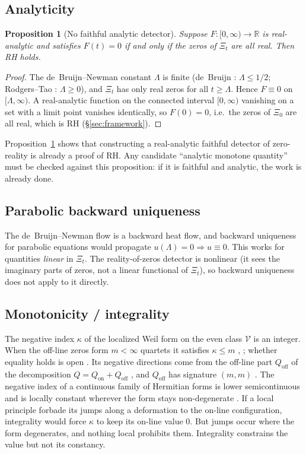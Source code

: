 \documentclass[11pt]{amsart}
\newtheorem{proposition}[theorem]{Proposition}
\theoremstyle{definition}
\theoremstyle{remark}
\newcommand{\bbR}{\mathbb{R}}
\begin{document}
\subsection{Analyticity}\label{ssec:analyticity}
\begin{proposition}[No faithful analytic detector]\label{prop:analytic}
Suppose $F:[0,\infty)\to\bbR$ is real-analytic and satisfies $F(t)=0$ if
and only if the zeros of $\Xi_t$ are all real. Then RH holds.
\end{proposition}
\begin{proof}
The de~Bruijn--Newman constant $\Lambda$ is finite (de~Bruijn \cite{dB}: $\Lambda\le1/2$;
Rodgers--Tao \cite{RT}: $\Lambda\ge0$), and $\Xi_t$ has only real zeros for all $t\geq\Lambda$.
Hence $F\equiv0$ on $[\Lambda,\infty)$. A real-analytic function on the connected interval
$[0,\infty)$ vanishing on a set with a limit point vanishes identically, so $F(0)=0$, i.e.\ the
zeros of $\Xi_0$ are all real, which is RH (\S\ref{sec:framework}).
\end{proof}

Proposition~\ref{prop:analytic} shows that constructing a real-analytic faithful detector of
zero-reality is already a proof of RH. Any candidate ``analytic monotone quantity'' must be
checked against this proposition: if it is faithful and analytic, the work is already done.

\subsection{Parabolic backward uniqueness}\label{ssec:backward}
The de~Bruijn--Newman flow is a backward heat flow, and backward uniqueness for parabolic
equations would propagate $u(\Lambda)=0\Rightarrow u\equiv0$. This works for quantities
\emph{linear} in $\Xi_t$. The reality-of-zeros detector is nonlinear (it sees the imaginary parts
of zeros, not a linear functional of $\Xi_t$), so backward uniqueness does not apply to it
directly.

\subsection{Monotonicity / integrality}\label{ssec:integrality}
The negative index $\kappa$ of the localized Weil form on the even class $\mathcal V$ is an
integer. When the off-line zeros form $m<\infty$ quartets it satisfies $\kappa\le m$
\cite[Prop.~2.5]{P25}, \cite[Cor.~6.5]{P18}; whether equality holds is open \cite{P25}. Its
negative directions come from the off-line part $Q_{\mathrm{off}}$ of the decomposition
$Q=Q_{\mathrm{on}}+Q_{\mathrm{off}}$ \cite[Thm.~3.1]{P18}, and $Q_{\mathrm{off}}$ has signature
$(m,m)$ \cite[Cor.~6.5]{P18}. The negative index of a continuous family of Hermitian forms is
lower semicontinuous and is locally constant wherever the form stays non-degenerate
\cite[Thm.~5.3]{P18}. If a local principle forbade its jumps along a deformation to the on-line
configuration, integrality would force $\kappa$ to keep its on-line value $0$. But jumps occur
where the form degenerates, and nothing local prohibits them. Integrality constrains the value
but not its constancy.
\end{document}
